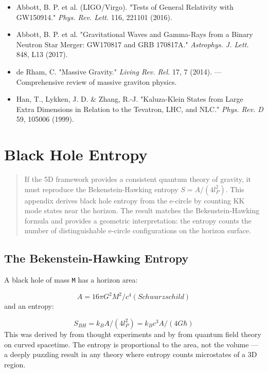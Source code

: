 \documentclass[aps,prd,preprint,superscriptaddress,longbibliography,floatfix]{revtex4-2}
\theoremstyle{remark}
\begin{document}
\begin{itemize}
  \item Abbott, B. P. et al. (LIGO/Virgo). "Tests of General Relativity with GW150914." \textit{Phys. Rev. Lett.} 116, 221101 (2016).
  \item Abbott, B. P. et al. "Gravitational Waves and Gamma-Rays from a Binary Neutron Star Merger: GW170817 and GRB 170817A." \textit{Astrophys. J. Lett.} 848, L13 (2017).
  \item de Rham, C. "Massive Gravity." \textit{Living Rev. Rel.} 17, 7 (2014). --- Comprehensive review of massive graviton physics.
  \item Han, T., Lykken, J. D. \& Zhang, R.-J. "Kaluza-Klein States from Large Extra Dimensions in Relation to the Tevatron, LHC, and NLC." \textit{Phys. Rev. D} 59, 105006 (1999).
\end{itemize}


\section{Black Hole Entropy}


\begin{quote}
If the 5D framework provides a consistent quantum theory of gravity, it
must reproduce the Bekenstein-Hawking entropy $S = A/(4l_P^{2})$. This appendix
derives black hole entropy from the e-circle by counting KK mode states
near the horizon. The result matches the Bekenstein-Hawking formula and
provides a geometric interpretation: the entropy counts the number of
distinguishable e-circle configurations on the horizon surface.
\end{quote}



\subsection{The Bekenstein-Hawking Entropy}

A black hole of mass \texttt{M} has a horizon area:


\begin{equation}
    A = 16\pi G^{2}M^{2}/c^{4}    (Schwarzschild)
\end{equation}
and an entropy:


\begin{equation}
    S_{BH} = k_B A / (4l_P^{2}) = k_B c^{3} A / (4G\hbar)
\end{equation}
This was derived by \cite{Bekenstein1973} from thought experiments and by \cite{Hawking1975} from quantum field theory on curved spacetime. The entropy is proportional to the area, not the volume --- a deeply puzzling result in any theory where entropy counts microstates of a 3D region.
\end{document}
